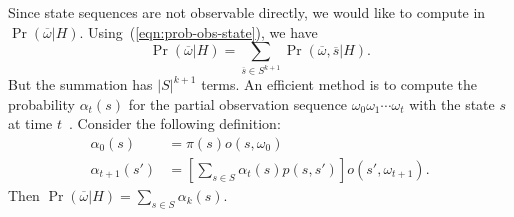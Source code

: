 Since state sequences are not observable directly, we would like to
compute in $\Pr (\overline{\omega} |
H)$. Using~(\ref{eqn:prob-obs-state}), we have
\[
  \Pr (\overline{\omega} | H) = \sum_{\overline{s} \in S^{k+1}}
  \Pr (\overline{\omega}, \overline{s} | H).
\]
But the summation has $|S|^{k+1}$ terms. An efficient method is to
compute the probability $\alpha_t (s)$ for the partial observation
sequence $\omega_0\omega_1\cdots\omega_t$ with the state $s$ at time
$t$~\cite{R:89:ATHMM}. Consider the following definition:
\begin{align}
  \alpha_0 (s) &= \pi(s) o (s, \omega_0)
  \label{hmm:basis}
  \\
  \alpha_{t+1} (s') &= \left[
                      \sum_{s \in S} \alpha_t (s) p (s, s')
                      \right]
                      o (s', \omega_{t+1}).
  \label{hmm:inductive}
\end{align}
Then $\Pr (\overline{\omega} | H) = \sum_{s \in S} \alpha_k (s)$.